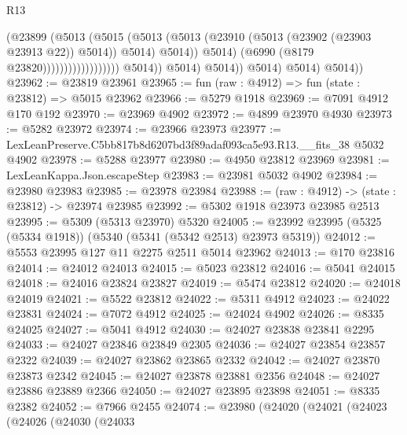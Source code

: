 \begin{lexlean}{R13}
\begin{coremodule}
                                                    (@23899
                                                      (@5013
                                                        (@5015
                                                          (@5013
                                                            (@5013
                                                              (@23910
                                                                (@5013
                                                                  (@23902 (@23903 @23913 @22))
                                                                  @5014))
                                                              @5014)
                                                            @5014))
                                                        @5014)
                                                      (@6990 (@8179 @23820))))))))))))))))))
                      @5014))
                  @5014)
                @5014))
            @5014)
          @5014)
        @5014))
@23962 := @23819 @23961
@23965 := fun (raw : @4912) => fun (state : @23812) => @5015 @23962
@23966 := @5279 @1918
@23969 := @7091 @4912 @170 @192
@23970 := @23969 @4902
@23972 := @4899 @23970 @4930
@23973 := @5282 @23972
@23974 := @23966 @23973
@23977 := LexLeanPreserve.C5bb817b8d6207bd3f89adaf093ca5e93.R13.__fits_38 @5032 @4902
@23978 := @5288 @23977
@23980 := @4950 @23812 @23969
@23981 := LexLeanKappa.Json.escapeStep
@23983 := @23981 @5032 @4902
@23984 := @23980 @23983
@23985 := @23978 @23984
@23988 := (raw : @4912) -> (state : @23812) -> @23974 @23985
@23992 := @5302 @1918 @23973 @23985 @2513
@23995 := @5309 (@5313 @23970) @5320
@24005 := @23992 @23995 (@5325 (@5334 @1918)) (@5340 (@5341 (@5342 @2513) @23973 @5319))
@24012 := @5553 @23995 @127 @11 @2275 @2511 @5014 @23962
@24013 := @170 @23816
@24014 := @24012 @24013
@24015 := @5023 @23812
@24016 := @5041 @24015
@24018 := @24016 @23824 @23827
@24019 := @5474 @23812
@24020 := @24018 @24019
@24021 := @5522 @23812
@24022 := @5311 @4912
@24023 := @24022 @23831
@24024 := @7072 @4912
@24025 := @24024 @4902
@24026 := @8335 @24025
@24027 := @5041 @4912
@24030 := @24027 @23838 @23841 @2295
@24033 := @24027 @23846 @23849 @2305
@24036 := @24027 @23854 @23857 @2322
@24039 := @24027 @23862 @23865 @2332
@24042 := @24027 @23870 @23873 @2342
@24045 := @24027 @23878 @23881 @2356
@24048 := @24027 @23886 @23889 @2366
@24050 := @24027 @23895 @23898
@24051 := @8335 @2382
@24052 := @7966 @2455
@24074 := @23980
    (@24020
      (@24021
        (@24023
          (@24026
            (@24030
              (@24033

\end{coremodule}
\end{lexlean}
